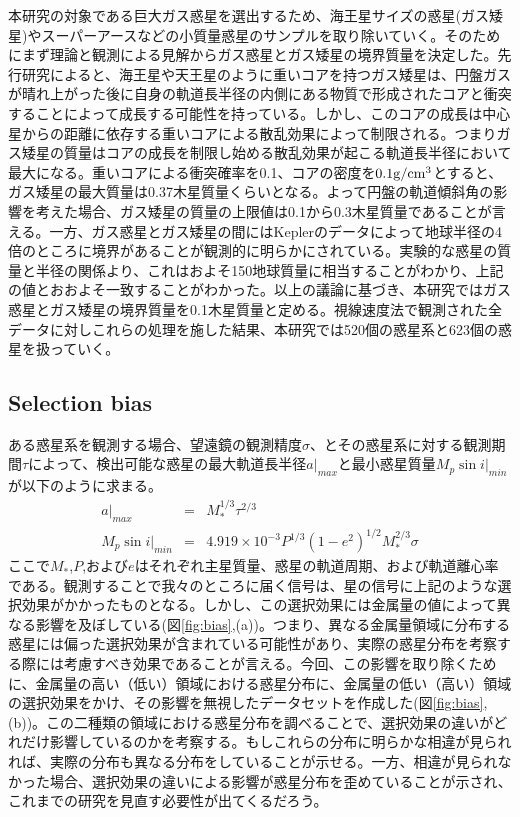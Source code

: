 \documentclass[twocolumn, dvipdfmx]{aastex62}
\begin{document}
\begin{CJK*}{UTF8}{min}
本研究の対象である巨大ガス惑星を選出するため、海王星サイズの惑星(ガス矮星)やスーパーアースなどの小質量惑星のサンプルを取り除いていく。そのためにまず理論と観測による見解からガス惑星とガス矮星の境界質量を決定した。先行研究によると\citep{2004ApJ...604..388I}、海王星や天王星のように重いコアを持つガス矮星は、円盤ガスが晴れ上がった後に自身の軌道長半径の内側にある物質で形成されたコアと衝突することによって成長する可能性を持っている。しかし、このコアの成長は中心星からの距離に依存する重いコアによる散乱効果によって制限される。つまりガス矮星の質量はコアの成長を制限し始める散乱効果が起こる軌道長半径において最大になる。重いコアによる衝突確率を0.1、コアの密度を$\rm 0.1 g/cm^3$とすると、ガス矮星の最大質量は0.37木星質量くらいとなる。よって円盤の軌道傾斜角の影響を考えた場合、ガス矮星の質量の上限値は0.1から0.3木星質量であることが言える。一方、ガス惑星とガス矮星の間にはKeplerのデータによって地球半径の4倍のところに境界があることが観測的に明らかにされている\citep{2012Natur.486..375B}。実験的な惑星の質量と半径の関係より、これはおよそ150地球質量に相当することがわかり\cite{2013ApJ...768...14W}、上記の値とおおよそ一致することがわかった。以上の議論に基づき、本研究ではガス惑星とガス矮星の境界質量を0.1木星質量と定める。視線速度法で観測された全データに対しこれらの処理を施した結果、本研究では520個の惑星系と623個の惑星を扱っていく。


\subsection{Selection bias} \label{subsec:bias}

ある惑星系を観測する場合、望遠鏡の観測精度$\sigma$、とその惑星系に対する観測期間$\tau$によって、検出可能な惑星の最大軌道長半径$a|_{max}$と最小惑星質量$M_p\sin i|_{min}$が以下のように求まる\citep{2008ApJ...677.1324T}。
\begin{eqnarray}
a|_{max} &=& M_{*}^{1/3}\tau^{2/3} \\
M_p\sin i|_{min} &=& 4.919\times10^{-3}P^{1/3}(1-e^2)^{1/2}M_{*}^{2/3}\sigma
\end{eqnarray}
ここで$M_*$,$P$,および$e$はそれぞれ主星質量、惑星の軌道周期、および軌道離心率である。観測することで我々のところに届く信号は、星の信号に上記のような選択効果がかかったものとなる。しかし、この選択効果には金属量の値によって異なる影響を及ぼしている(図\ref{fig:bias},(a))。つまり、異なる金属量領域に分布する惑星には偏った選択効果が含まれている可能性があり、実際の惑星分布を考察する際には考慮すべき効果であることが言える。今回、この影響を取り除くために、金属量の高い（低い）領域における惑星分布に、金属量の低い（高い）領域の選択効果をかけ、その影響を無視したデータセットを作成した(図\ref{fig:bias},(b))。この二種類の領域における惑星分布を調べることで、選択効果の違いがどれだけ影響しているのかを考察する。もしこれらの分布に明らかな相違が見られれば、実際の分布も異なる分布をしていることが示せる。一方、相違が見られなかった場合、選択効果の違いによる影響が惑星分布を歪めていることが示され、これまでの研究を見直す必要性が出てくるだろう。


\end{CJK*}
\end{document}

